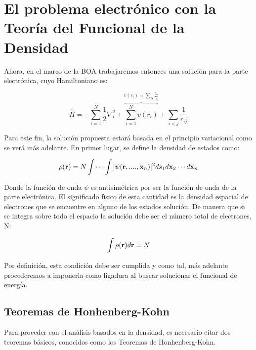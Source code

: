 \documentclass [11pt]{article}
\begin{document}
\section{El problema electrónico con la Teoría del Funcional de la Densidad}

Ahora, en el marco de la BOA trabajaremos entonces una solución para la parte electrónica, cuyo Hamiltoniano es:

\begin{equation}
	\hat{H}=-\sum_{i=1}^{N}\frac{1}{2}\nabla_i^2+\overbrace{\sum_{i=1}^{N}v(r_i)}^{v(r_i)=\sum_{\alpha}\frac{z_\alpha}{r_{ij}}}+\sum_{i<j} \frac{1}{r_{ij}}
\end{equation}

Para este fin, la solución propuesta estará basada en el principio variacional como se verá más adelante. En primer lugar, se define la densidad de estados como:

\begin{equation}
	\rho({\bf r})=N\int\cdots\int |\psi({\bf r},....,{\bf x} _n)|^2 ds_1 d{\bf x}_2\cdots d{\bf x}_n
\end{equation}

Donde la función de onda $\psi$ es antisimétrica por ser la función de onda de la parte electrónica. El significado físico de esta cantidad es la densidad espacial de electrones que se encuentre en alguno de los estados solución. De manera que si se integra sobre todo el espacio la solución debe ser el número total de electrones, N:

\begin{equation}\label{norma}
	\int \rho({\bf r})d{\bf r}=N
\end{equation}

Por definición, esta condición debe ser cumplida y como tal, más adelante procederemos a imponerla como ligadura al buscar solucionar el funcional de energía.


\subsection{Teoremas de Honhenberg-Kohn}
Para proceder con el análisis basados en la densidad, es necesario citar dos teoremas básicos, conocidos como los Teoremas de Honhenberg-Kohn.\\
\end{document}
